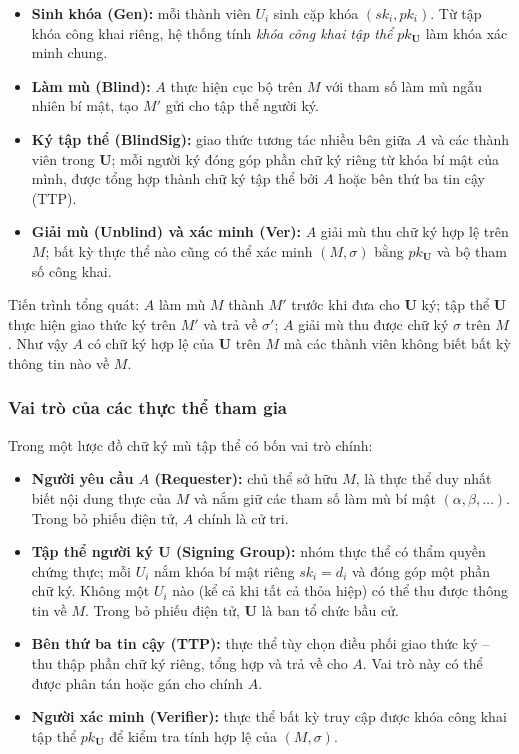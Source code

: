 \begin{itemize}
    \item \textbf{Sinh khóa (\textsf{Gen}):} mỗi thành viên $U_i$ sinh cặp khóa $(sk_i, pk_i)$. Từ tập khóa công khai riêng, hệ thống tính \textit{khóa công khai tập thể} $pk_{\mathbf{U}}$ làm khóa xác minh chung.
    \item \textbf{Làm mù (\textsf{Blind}):} $A$ thực hiện cục bộ trên $M$ với tham số làm mù ngẫu nhiên bí mật, tạo $M'$ gửi cho tập thể người ký.
    \item \textbf{Ký tập thể (\textsf{BlindSig}):} giao thức tương tác nhiều bên giữa $A$ và các thành viên trong $\mathbf{U}$; mỗi người ký đóng góp phần chữ ký riêng từ khóa bí mật của mình, được tổng hợp thành chữ ký tập thể bởi $A$ hoặc bên thứ ba tin cậy (TTP).
    \item \textbf{Giải mù (\textsf{Unblind}) và xác minh (\textsf{Ver}):} $A$ giải mù thu chữ ký hợp lệ trên $M$; bất kỳ thực thể nào cũng có thể xác minh $(M, \sigma)$ bằng $pk_{\mathbf{U}}$ và bộ tham số công khai.
\end{itemize}

Tiến trình tổng quát: $A$ làm mù $M$ thành $M'$ trước khi đưa cho $\mathbf{U}$ ký; tập thể $\mathbf{U}$ thực hiện giao thức ký trên $M'$ và trả về $\sigma'$; $A$ giải mù thu được chữ ký $\sigma$ trên $M$. Như vậy $A$ có chữ ký hợp lệ của $\mathbf{U}$ trên $M$ mà các thành viên không biết bất kỳ thông tin nào về $M$.

\subsubsection{Vai trò của các thực thể tham gia}

Trong một lược đồ chữ ký mù tập thể có bốn vai trò chính:

\begin{itemize}
    \item \textbf{Người yêu cầu $A$ (Requester):} chủ thể sở hữu $M$, là thực thể duy nhất biết nội dung thực của $M$ và nắm giữ các tham số làm mù bí mật $(\alpha, \beta, \ldots)$. Trong bỏ phiếu điện tử, $A$ chính là cử tri.

    \item \textbf{Tập thể người ký $\mathbf{U}$ (Signing Group):} nhóm thực thể có thẩm quyền chứng thực; mỗi $U_i$ nắm khóa bí mật riêng $sk_i = d_i$ và đóng góp một phần chữ ký. Không một $U_i$ nào (kể cả khi tất cả thỏa hiệp) có thể thu được thông tin về $M$. Trong bỏ phiếu điện tử, $\mathbf{U}$ là ban tổ chức bầu cử.

    \item \textbf{Bên thứ ba tin cậy (TTP):} thực thể tùy chọn điều phối giao thức ký -- thu thập phần chữ ký riêng, tổng hợp và trả về cho $A$. Vai trò này có thể được phân tán hoặc gán cho chính $A$.

    \item \textbf{Người xác minh (Verifier):} thực thể bất kỳ truy cập được khóa công khai tập thể $pk_{\mathbf{U}}$ để kiểm tra tính hợp lệ của $(M, \sigma)$.
\end{itemize}

